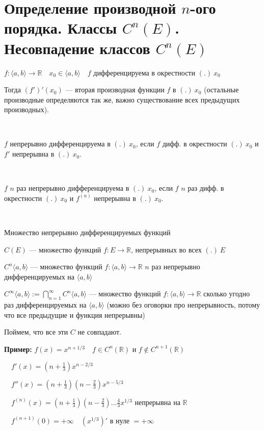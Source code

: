 \section{Определение производной $n$-ого порядка. Классы $C^n(E)$. Несовпадение классов $C^n(E)$}

\begin{conj} 
    $f: \langle a, b \rangle \rightarrow \mathbb{R} \quad x_0 \in \langle a, b \rangle \quad f$ дифференцируема в окрестности $(.) \ x_0$

    Тогда $(f')'(x_0)$ --- вторая производная функции $f$ в $(.) \ x_0$ (остальные производные определяются так же, важно существование всех предыдущих производных).
\end{conj}
\
\begin{conj}
    $f$ непрерывно дифференцируема в $(.) \ x_0$, если $f$ дифф. в окрестности $(.) \ x_0$ и $f'$ непрерывна в $(.) \ x_0$.
\end{conj}
\
\begin{conj}
    $f$ $n$ раз непрерывно дифференцируема в $(.) \ x_0$, если $f$ $n$ раз дифф. в окрестности $(.) \ x_0$ и $f^{(n)}$ непрерывна в $(.) \ x_0$.
\end{conj}
\
\begin{conj}
    Множество непрерывно дифференцируемых функций

    $C(E)$ --- множество функций $f: E \rightarrow \mathbb{R}$, непрерывных во всех $(.) \ E$

    $C^n \langle a, b \rangle$ --- множество функций $f: \langle a, b \rangle \rightarrow \mathbb{R}$ $n$ раз непрерывно дифференцируемых на $\langle a, b \rangle$

    $C^\infty \langle a, b \rangle := \bigcap\limits_{n=1}^{\infty} C^n \langle a, b \rangle$ --- множество функций $f: \langle a, b \rangle \rightarrow \mathbb{R}$ сколько угодно раз дифференцируемых на $\langle a, b \rangle$ (можно без оговорки про непрерывность, потому что все предыдущие и функция непрерывны)
\end{conj}

Поймем, что все эти $C$ не совпадают.
\par\medskip
\textbf{Пример:} $f(x) = x^{n+1/3} \quad f \in C^n(\mathbb{R})$ и $f \notin C^{n+1}(\mathbb{R})$

$\quad f'(x) = (n + \frac{1}{3})x^{n-2/3}$

$\quad f''(x) = (n + \frac{1}{3})(n - \frac{2}{3})x^{n-5/3}$

$\quad f^{(n)}(x) = (n + \frac{1}{3})(n - \frac{2}{3}) \dots \frac{4}{3} x^{1/3}$ непрерывна на $\mathbb{R}$

$\quad f^{(n+1)}(0) = +\infty \quad (x^{1/3})'$ в нуле $= +\infty$


